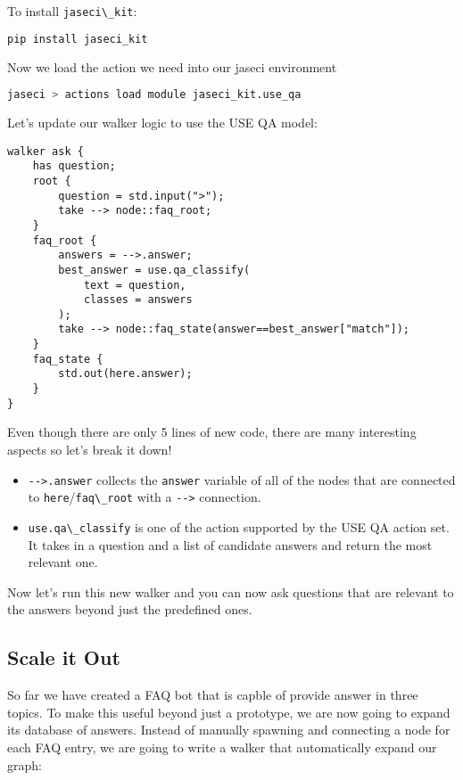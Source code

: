 To install \passthrough{\lstinline!jaseci\_kit!}:

\begin{lstlisting}[language=bash]
pip install jaseci_kit
\end{lstlisting}

Now we load the action we need into our jaseci environment

\begin{lstlisting}[language=bash]
jaseci > actions load module jaseci_kit.use_qa
\end{lstlisting}

Let's update our walker logic to use the USE QA model:

\begin{lstlisting}
walker ask {
    has question;
    root {
        question = std.input(">");
        take --> node::faq_root;
    }
    faq_root {
        answers = -->.answer;
        best_answer = use.qa_classify(
            text = question,
            classes = answers
        );
        take --> node::faq_state(answer==best_answer["match"]);
    }
    faq_state {
        std.out(here.answer);
    }
}
\end{lstlisting}

Even though there are only 5 lines of new code, there are many
interesting aspects so let's break it down!

\begin{itemize}
\tightlist
\item
  \passthrough{\lstinline!-->.answer!} collects the
  \passthrough{\lstinline!answer!} variable of all of the nodes that are
  connected to
  \passthrough{\lstinline!here!}/\passthrough{\lstinline!faq\_root!}
  with a \passthrough{\lstinline!-->!} connection.
\item
  \passthrough{\lstinline!use.qa\_classify!} is one of the action
  supported by the USE QA action set. It takes in a question and a list
  of candidate answers and return the most relevant one.
\end{itemize}

Now let's run this new walker and you can now ask questions that are
relevant to the answers beyond just the predefined ones.

\hypertarget{scale-it-out}{%
\subsection{Scale it Out}\label{scale-it-out}}

So far we have created a FAQ bot that is capble of provide answer in
three topics. To make this useful beyond just a prototype, we are now
going to expand its database of answers. Instead of manually spawning
and connecting a node for each FAQ entry, we are going to write a walker
that automatically expand our graph:

